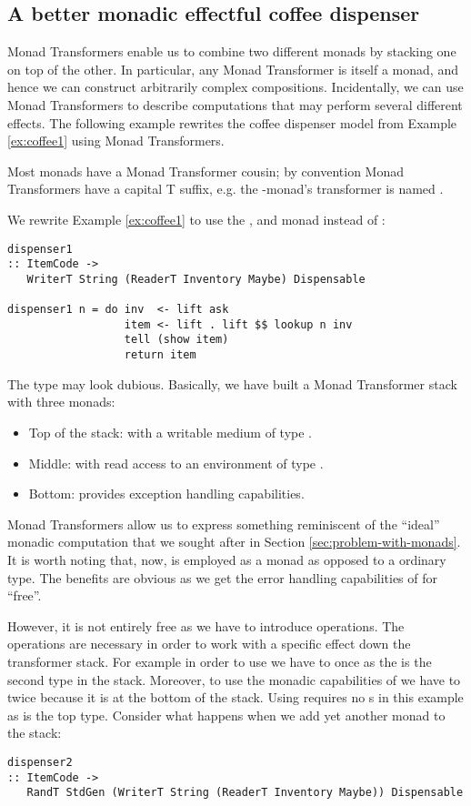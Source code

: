 \subsection{A better monadic effectful coffee dispenser}\label{sec:mt}
Monad Transformers enable us to combine two different monads by stacking one on top of the other.
In particular, any Monad Transformer is itself a monad, and hence we can construct arbitrarily complex compositions.
Incidentally, we can use Monad Transformers to describe computations that may perform several different effects.
The following example rewrites the coffee dispenser model from Example \ref{ex:coffee1} using Monad Transformers.
\begin{example}\label{ex:coffee2}
Most monads have a Monad Transformer cousin; by convention Monad Transformers have a capital T suffix, e.g. the -monad's transformer is named .

We rewrite Example \ref{ex:coffee1} to use the , and  monad instead of :
\begin{lstlisting}[style={haskell}]
dispenser1 
:: ItemCode -> 
   WriterT String (ReaderT Inventory Maybe) Dispensable

dispenser1 n = do inv  <- lift ask
                  item <- lift . lift $$ lookup n inv
                  tell (show item)
                  return item
\end{lstlisting}
The type may look dubious. Basically, we have built a Monad Transformer stack with three monads:
\begin{itemize}
  \item Top of the stack:  with a writable medium of type .
  \item Middle:  with read access to an environment of type .
  \item Bottom:  provides exception handling capabilities.
\end{itemize}
Monad Transformers allow us to express something reminiscent of the ``ideal'' monadic computation that we sought after in Section \ref{sec:problem-with-monads}. It is worth noting that, now,   is employed as a monad as opposed to a ordinary type. The benefits are obvious as we get the error handling capabilities of  for ``free''.

However, it is not entirely free as we have to introduce  operations. The  operations are necessary in order to work with a specific effect down the transformer stack. For example in order to use  we have to  once as the  is the second type in the stack. Moreover, to use the monadic capabilities of  we have to  twice because it is at the bottom of the stack. Using  requires no s in this example as  is the top type. 
Consider what happens when we add yet another monad to the stack:
\begin{lstlisting}[style={haskell}]
dispenser2 
:: ItemCode -> 
   RandT StdGen (WriterT String (ReaderT Inventory Maybe)) Dispensable


\end{lstlisting}
\end{example}

